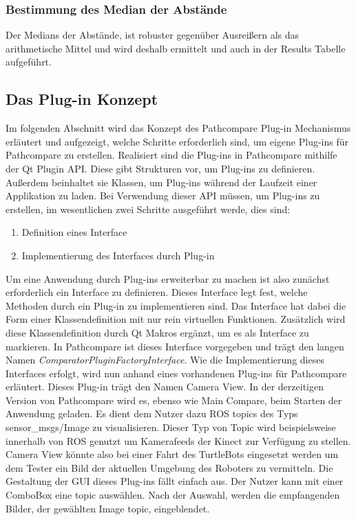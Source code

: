 \subsubsection{Bestimmung des Median der Abstände}
Der Medians der Abstände, ist robuster gegenüber Ausreißern als das
arithmetische Mittel und wird deshalb ermittelt und auch in der Results Tabelle
aufgeführt.

\subsection{Das Plug-in Konzept}
Im folgenden Abschnitt wird das Konzept des Pathcompare Plug-in Mechanismus
erläutert und aufgezeigt, welche Schritte erforderlich sind, um eigene Plug-ins
für Pathcompare zu erstellen. Realisiert sind die Plug-ins in Pathcompare
mithilfe der Qt Plugin API. Diese gibt Strukturen vor, um Plug-ins zu
definieren. Außerdem beinhaltet sie Klassen, um Plug-ins während der Laufzeit
einer Applikation zu laden.  Bei Verwendung dieser API müssen, um Plug-ins zu
erstellen, im wesentlichen zwei Schritte ausgeführt werde, dies sind:

\begin{enumerate}
  \item Definition eines Interface
  \item Implementierung des Interfaces durch Plug-in
\end{enumerate}

Um eine Anwendung durch Plug-ins erweiterbar zu machen ist also zunächst erforderlich ein
Interface zu definieren. Dieses Interface legt fest, welche Methoden durch ein
Plug-in zu implementieren sind. Das Interface hat dabei
die Form einer Klassendefinition mit nur rein virtuellen Funktionen. Zusätzlich
wird diese Klassendefinition durch Qt Makros ergänzt, um es als Interface zu
markieren. In Pathcompare ist dieses Interface vorgegeben und trägt den langen
Namen \textit{ComparatorPluginFactoryInterface}. Wie die Implementierung dieses
Interfaces erfolgt, wird nun anhand eines vorhandenen Plug-ins für Pathcompare erläutert.
Dieses Plug-in trägt den Namen Camera View. In der derzeitigen Version von
Pathcompare wird es, ebenso wie Main Compare, beim Starten der Anwendung geladen.
Es dient dem Nutzer dazu ROS topics des Typs sensor\_msgs/Image zu
visualisieren. Dieser Typ von Topic wird beispielsweise innerhalb von ROS
genutzt um Kamerafeeds der Kinect zur Verfügung zu stellen. Camera View könnte also
bei einer Fahrt des TurtleBots eingesetzt werden um dem Tester ein Bild der
aktuellen Umgebung des Roboters zu vermitteln. Die Gestaltung der GUI dieses
Plug-ins fällt einfach aus. Der Nutzer kann mit einer ComboBox eine topic
auswählen. Nach der Auswahl, werden die empfangenden Bilder, der gewählten Image
topic, eingeblendet. 


